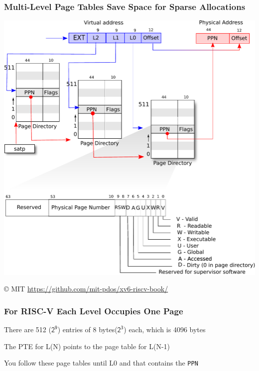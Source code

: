  \begin{frame}
    \frametitle{Multi-Level Page Tables Save Space for Sparse Allocations}

    \begin{center}
      \includegraphics[scale=0.5, clip, trim=0cm 8cm 0cm 0cm]{riscv_pagetable.pdf}
    \end{center}

    © MIT \url{https://github.com/mit-pdos/xv6-riscv-book/}
  \end{frame}

  \begin{frame}
    \frametitle{For RISC-V Each Level Occupies One Page}

    There are 512 ($\mathsf{2^9}$) entries of 8 bytes($\mathsf{2^3}$) each, which is 4096 bytes

    \vspace{2em}

    The PTE for L(N) points to the page table for L(N-1)

    \vspace{2em}

    You follow these page tables until L0 and that contains the \texttt{PPN}
  \end{frame}

